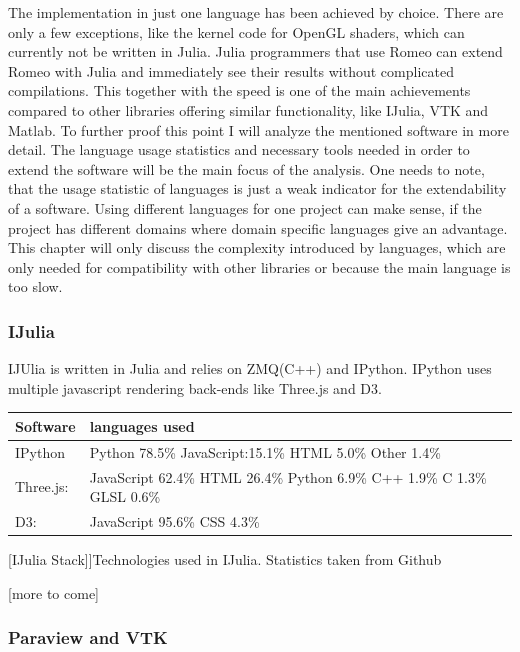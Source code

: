 The implementation in just one language has been achieved by choice. There are only a few exceptions, like the kernel code for OpenGL shaders, which can currently not be written in Julia. 
Julia programmers that use Romeo can extend Romeo with Julia and immediately see their results without complicated compilations.
This together with the speed is one of the main achievements compared to other libraries offering similar functionality, like IJulia, VTK and Matlab.
To further proof this point I will analyze the mentioned software in more detail.
The language usage statistics and necessary tools needed in order to extend the software will be the main focus of the analysis.
One needs to note, that the usage statistic of languages is just a weak indicator for the extendability of a software.
Using different languages for one project can make sense, if the project has different domains where domain specific languages give an advantage.
This chapter will only discuss the complexity introduced by languages, which are only needed for compatibility with other libraries or because the main language is too slow.

\subsubsection{IJulia}

IJUlia is written in Julia and relies on ZMQ(C++) and IPython. 
IPython uses multiple javascript rendering back-ends like Three.js and D3.
\begin{table}[htbp]
    \centering
    \begin{tabular}{l|l}
        \hline
        \textbf{Software} & \textbf{languages used}\\
        \hline
        IPython     & Python 78.5\% JavaScript:15.1\% HTML 5.0\% Other 1.4\%\\
        Three.js:   & JavaScript 62.4\% HTML 26.4\% Python 6.9\% C++ 1.9\% C 1.3\% GLSL 0.6\%\\
        D3:         & JavaScript 95.6\% CSS 4.3\%\\
        \hline
        \end{tabular}
    [IJulia Stack]]{Technologies used in IJulia. Statistics taken from Github}
    \label{table:ijuliastack}
\end{table}
[more to come]
\subsubsection{Paraview and VTK}

